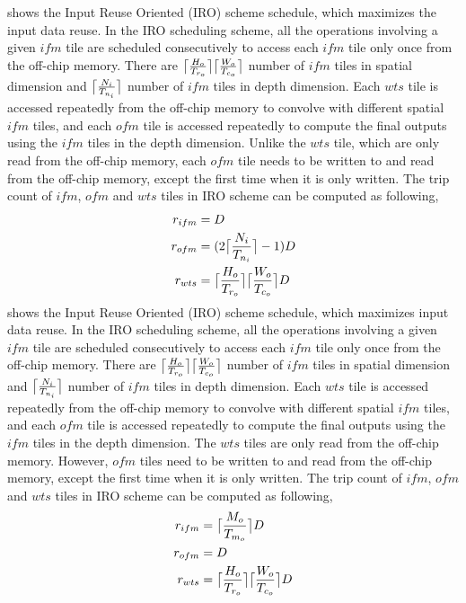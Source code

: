  shows the Input Reuse Oriented (IRO) scheme schedule, which maximizes the input data reuse. In the IRO scheduling scheme, all the operations involving a given $ifm$ tile are scheduled consecutively to access each $ifm$ tile only once from the off-chip memory. There are $\ceil[\big]{\frac{H_o}{T_{r_o}}}\ceil[\big]{\frac{W_o}{T_{c_o}}}$ number of $ifm$ tiles in spatial dimension and $\ceil[\big]{\frac{N_i}{T_{n_i}}}$ number of $ifm$ tiles in depth dimension. Each $wts$ tile is accessed repeatedly from the off-chip memory to convolve with different spatial $ifm$ tiles, and each $ofm$ tile is accessed repeatedly to compute the final outputs using the $ifm$ tiles in the depth dimension. Unlike the $wts$ tile, which are only read from the off-chip memory, each $ofm$ tile needs to be written to and read from the off-chip memory, except the first time when it is only written. The trip count of $ifm$, $ofm$ and $wts$ tiles in IRO scheme can be computed as following,
\begin{align}\label{eq:IROTripCount}
	\begin{split}
	r_{ifm} &= D \\
	r_{ofm}&= (2\ceil[\big]{\frac{N_i}{T_{n_i}}}-1)D \\
	r_{wts} &= \ceil[\big]{\frac{H_o}{T_{r_o}}}\ceil[\big]{\frac{W_o}{T_{c_o}}}D
	\end{split}
\end{align}
 shows the Input Reuse Oriented (IRO) scheme schedule, which maximizes input data reuse. In the IRO scheduling scheme, all the operations involving a given $ifm$ tile are scheduled consecutively to access each $ifm$ tile only once from the off-chip memory. There are $\ceil[\big]{\frac{H_o}{T_{r_o}}}\ceil[\big]{\frac{W_o}{T_{c_o}}}$ number of $ifm$ tiles in spatial dimension and $\ceil[\big]{\frac{N_i}{T_{n_i}}}$ number of $ifm$ tiles in depth dimension. Each $wts$ tile is accessed repeatedly from the off-chip memory to convolve with different spatial $ifm$ tiles, and each $ofm$ tile is accessed repeatedly to compute the final outputs using the $ifm$ tiles in the depth dimension. The $wts$ tiles are only read from the off-chip memory. However, $ofm$ tiles need to be written to and read from the off-chip memory, except the first time when it is only written. The trip count of $ifm$, $ofm$ and $wts$ tiles in IRO scheme can be computed as following,
\begin{align}\label{eq:OROTripCount}
	\begin{split}
		r_{ifm} &= \ceil[\big]{\frac{M_o}{T_{m_o}}}D \\
		r_{ofm}&= D \\
		r_{wts} &= \ceil[\big]{\frac{H_o}{T_{r_o}}}\ceil[\big]{\frac{W_o}{T_{c_o}}} D
	\end{split}
\end{align}
